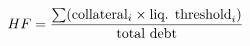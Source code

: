 \documentclass[preview]{standalone}
\begin{document}
\begin{align*}
\special{dvisvgm:raw <g id='unique000'>}HF = \frac{\sum (\text{collateral}_i \times \text{liq. threshold}_i)}{\text{total debt}}\special{dvisvgm:raw </g>}
\end{align*}
\end{document}
